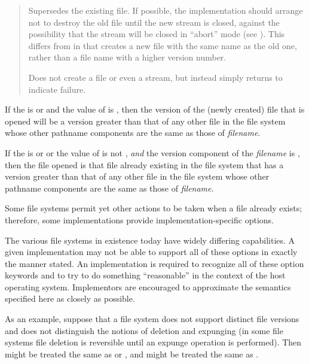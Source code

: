 \begin{defun}[Function]
\begin{flushdesc}
\begin{quotation}
\begin{flushdesc}
\item[\cd{:supersede}]
Supersedes the existing file.  If possible, the implementation should
arrange not to destroy the old file until the new stream is closed,
against the possibility that the stream will be closed in ``abort'' mode
(see ).
This differs from  in that  creates
a new file with the same name as the old one, rather than a file
name with a higher version number.

\item[\cd{\false}]
Does not create a file or even a stream, but instead
simply returns {\false} to indicate failure.
\end{flushdesc}
\end{quotation}

If the  is  or 
and the value of  is ,
then the version of the (newly created) file that is opened will
be a version greater than that of any other file in the file system
whose other pathname components are the same as those of {\it filename}.

If the  is  or 
or the value of  is not ,
{\it and} the version component of the {\it filename} is ,
then the file opened is that file already existing in the file system
that has a version greater than that of any other file in the file system
whose other pathname components are the same as those of {\it filename}.

\begin{new}
Some file systems permit yet other actions to be taken when a file
already exists; therefore,
some implementations provide implementation-specific  options.
\end{new}
\end{flushdesc}

\beforenoterule
\begin{implementation}
The various file systems in existence today
have widely differing capabilities.  A given implementation may not
be able to support all of these options in exactly the manner stated.
An implementation is required to recognize all of these option keywords
and to try to do something ``reasonable'' in the context of the host operating
system.  Implementors are encouraged to approximate the semantics specified
here as closely as possible.

As an example, suppose that a file system does not support distinct file
versions and does not distinguish the notions of deletion and expunging
(in some file systems file deletion is reversible until an expunge operation
is performed).  Then  might be treated the same as
 or , and  might
be treated the same as .


\end{implementation}
\end{defun}
